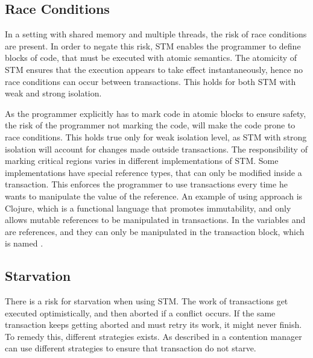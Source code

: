 \subsection{Race Conditions}
In a setting with shared memory and multiple threads, the risk of race conditions are present. In order to negate this risk, \ac{STM} enables the programmer to define blocks of code, that must be executed with atomic semantics. The atomicity of \ac{STM} ensures that the execution appears to take effect instantaneously, hence no race conditions can occur between transactions. This holds for both \ac{STM} with weak and strong isolation.

As the programmer explicitly has to mark code in atomic blocks to ensure safety, the risk of the programmer not marking the code, will make the code prone to race conditions. This holds true only for weak isolation level, as \ac{STM} with strong isolation will account for changes made outside transactions. The responsibility of marking critical regions varies in different implementations of \ac{STM}. Some implementations have special reference types, that can only be modified inside a transaction. This enforces the programmer to use transactions every time he wants to manipulate the value of the reference. An example of using approach is Clojure, which is a functional language that promotes immutability, and only allows mutable references to be manipulated in transactions. In  the variables  and  are references, and they can only be manipulated in the transaction block, which is named .

\subsection{Starvation}
There is a risk for starvation when using \ac{STM}. The work of transactions get executed optimistically, and then aborted if a conflict occurs. If the same transaction keeps getting aborted and must retry its work, it might never finish. To remedy this, different strategies exists. As described in  a contention manager can use different strategies to ensure that transaction do not starve.

